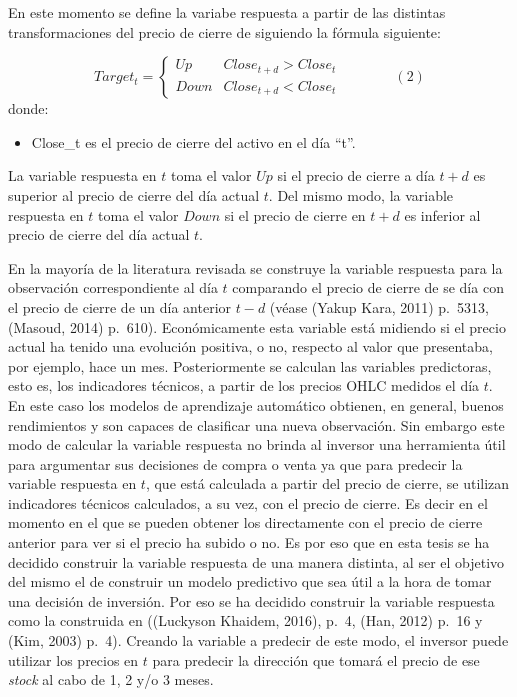 \documentclass[]{DissertateUSU}
\providecommand{\tightlist}{%
  \setlength{\itemsep}{0pt}\setlength{\parskip}{0pt}}
\begin{document}
\noindent En este momento se define la variabe respuesta a partir de las
distintas transformaciones del precio de cierre de siguiendo la fórmula
siguiente:

\[ Target_t =\begin{cases}Up & Close_{t+d} > Close_{t} \\Down & Close_{t+d} < Close_{t}\end{cases} \ \ \ \ \ \ \ \ \ \ \ \ \ \ \ \ \ (2)\]
\noindent donde:

\begin{itemize}
\tightlist
\item
  Close\_t es el precio de cierre del activo en el día ``t''.
\end{itemize}

\setlength\parskip{8ex}

\noindent La variable respuesta en \(t\) toma el valor \(Up\) si el
precio de cierre a día \(t+d\) es superior al precio de cierre del día
actual \(t\). Del mismo modo, la variable respuesta en \(t\) toma el
valor \(Down\) si el precio de cierre en \(t+d\) es inferior al precio
de cierre del día actual \(t\).

\setlength\parskip{5ex}
\justifying

\noindent En la mayoría de la literatura revisada se construye la
variable respuesta para la observación correspondiente al día \(t\)
comparando el precio de cierre de se día con el precio de cierre de un
día anterior \(t-d\) (véase (Yakup Kara, 2011) p.~5313, (Masoud, 2014)
p.~610). Económicamente esta variable está midiendo si el precio actual
ha tenido una evolución positiva, o no, respecto al valor que
presentaba, por ejemplo, hace un mes. Posteriormente se calculan las
variables predictoras, esto es, los indicadores técnicos, a partir de
los precios OHLC medidos el día \(t\). En este caso los modelos de
aprendizaje automático obtienen, en general, buenos rendimientos y son
capaces de clasificar una nueva observación. Sin embargo este modo de
calcular la variable respuesta no brinda al inversor una herramienta
útil para argumentar sus decisiones de compra o venta ya que para
predecir la variable respuesta en \(t\), que está calculada a partir del
precio de cierre, se utilizan indicadores técnicos calculados, a su vez,
con el precio de cierre. Es decir en el momento en el que se pueden
obtener los directamente con el precio de cierre anterior para ver si el
precio ha subido o no. Es por eso que en esta tesis se ha decidido
construir la variable respuesta de una manera distinta, al ser el
objetivo del mismo el de construir un modelo predictivo que sea útil a
la hora de tomar una decisión de inversión. Por eso se ha decidido
construir la variable respuesta como la construida en ((Luckyson
Khaidem, 2016), p.~4, (Han, 2012) p.~16 y (Kim, 2003) p.~4). Creando la
variable a predecir de este modo, el inversor puede utilizar los precios
en \(t\) para predecir la dirección que tomará el precio de ese
\emph{stock} al cabo de 1, 2 y/o 3 meses.
\end{document}
